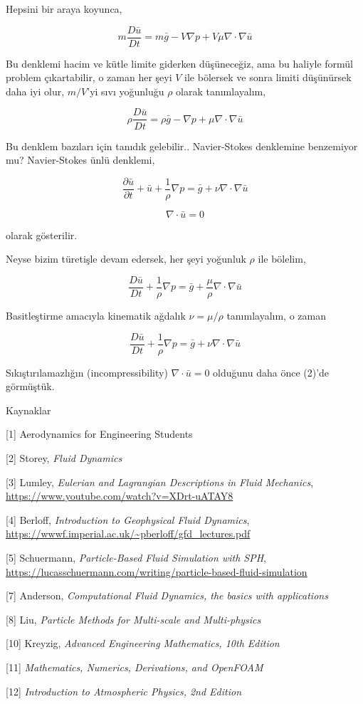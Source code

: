 \documentclass[12pt,fleqn]{article}\usepackage{../../common}
\begin{document}
Hepsini bir araya koyunca,

$$
m \frac{D \bar{u}}{D t} = m\bar{g} - V \nabla p + V \mu \nabla \cdot \nabla \bar{u}
$$

Bu denklemi hacim ve kütle limite giderken düşüneceğiz, ama bu haliyle formül
problem çıkartabilir, o zaman her şeyi $V$ ile bölersek ve sonra limiti
düşünürsek daha iyi olur, $m/V$'yi sıvı yoğunluğu $\rho$ olarak tanımlayalım,

$$
\rho \frac{D \bar{u}}{D t} = \rho \bar{g} -
\nabla p +
\mu \nabla \cdot \nabla \bar{u}
$$

Bu denklem bazıları için tanıdık gelebilir.. Navier-Stokes denklemine benzemiyor
mu? Navier-Stokes ünlü denklemi,

$$
\frac{\partial \bar{u}}{\partial t} + \bar{u} + \frac{1}{\rho} \nabla p =
\bar{g} + \nu \nabla \cdot \nabla \bar{u}
$$

$$
\nabla \cdot \bar{u} = 0
$$

olarak gösterilir.

Neyse bizim türetişle devam edersek, her şeyi yoğunluk $\rho$ ile bölelim,

$$
\frac{D \bar{u}}{D t} + \frac{1}{\rho} \nabla p =
\bar{g}  + \frac{\mu}{\rho} \nabla \cdot \nabla \bar{u}
$$

Basitleştirme amacıyla kinematik ağdalık $\nu = \mu / \rho$ tanımlayalım, o
zaman 

$$
\frac{D \bar{u}}{D t} + \frac{1}{\rho} \nabla p =
\bar{g}  + \nu \nabla \cdot \nabla \bar{u}
$$

Sıkıştırılamazlığın (incompressibility) $\nabla \cdot \bar{u} = 0$ olduğunu daha
önce (2)'de görmüştük.

Kaynaklar

[1] Aerodynamics for Engineering Students

[2] Storey, {\em Fluid Dynamics}

[3] Lumley, {\em Eulerian and Lagrangian Descriptions in Fluid Mechanics},
    \url{https://www.youtube.com/watch?v=XDrt-uATAY8}

[4] Berloff, {\em Introduction to Geophysical Fluid Dynamics},
    \url{https://wwwf.imperial.ac.uk/~pberloff/gfd_lectures.pdf}

[5] Schuermann, {\em Particle-Based Fluid Simulation with SPH},
    \url{https://lucasschuermann.com/writing/particle-based-fluid-simulation}

[7] Anderson, {\em Computational Fluid Dynamics, the basics with applications}

[8] Liu, {\em Particle Methods for Multi-scale and Multi-physics}

[10] Kreyzig, {\em Advanced Engineering Mathematics, 10th Edition}

[11] {\em Mathematics, Numerics, Derivations, and OpenFOAM}

[12] {\em Introduction to Atmospheric Physics, 2nd Edition}
\end{document}
